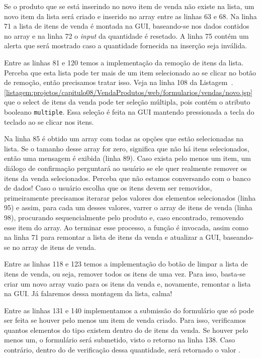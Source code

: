 Se o produto que se está inserindo no novo item de venda não existe na lista, um novo item da lista será criado e inserido no array entre as linhas 63 e 68. Na linha 71 a lista de itens de venda é montada na GUI, baseando-se nos dados contidos no array  e na linha 72 o \textit{input} da quantidade é resetado. A linha 75 contém um alerta que será mostrado caso a quantidade fornecida na inserção seja inválida.

Entre as linhas 81 e 120 temos a implementação da remoção de itens da lista. Perceba que esta lista pode ter mais de um item selecionado ao se clicar no botão de remoção, então precisamos tratar isso. Veja na linha 108 da Listagem~\thechapter.\ref{listagem:projetos/capitulo08/VendaProdutos/web/formularios/vendas/novo.jsp} que o select de itens da venda pode ter seleção múltipla, pois contém o atributo booleano \texttt{multiple}. Essa seleção é feita na GUI mantendo pressionada a tecla  do teclado ao se clicar nos itens.

Na linha 85 é obtido um array com todas as opções que estão selecionadas na lista. Se o tamanho desse array for zero, significa que não há itens selecionados, então uma mensagem é exibida (linha 89). Caso exista pelo menos um item, um diálogo de confirmação perguntará ao usuário se ele quer realmente remover os itens da venda selecionados. Perceba que não estamos conversando com o banco de dados! Caso o usuário escolha que os itens devem ser removidos, primeiramente precisamos iterarar pelos valores dos elementos selecionados (linha 95) e assim, para cada um desses valores, varrer o array de itens de venda (linha 98), procurando sequencialmente pelo produto e, caso encontrado, removendo esse item do array. Ao terminar esse processo, a função  é invocada, assim como na linha 71 para remontar a lista de itens da venda e atualizar a GUI, baseando-se no array de itens de venda.

Entre as linhas 118 e 123 temos a implementação do botão de limpar a lista de itens de venda, ou seja, remover todos os itens de uma vez. Para isso, basta-se criar um novo array vazio para os itens da venda e, novamente, remontar a lista na GUI. Já falaremos dessa montagem da lista, calma!

Entre as linhas 131 e 140 implementamos a submissão do formulário que só pode ser feita se houver pelo menos um item de venda criado. Para isso, verificamos quantos elementos do tipo  existem dentro do  de itens da venda. Se houver pelo menos um, o formulário será submetido, visto o retorno  na linha 138. Caso contrário, dentro do  de verificação dessa quantidade, será retornado o valor .

